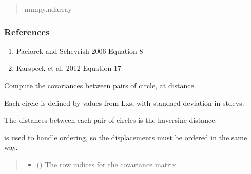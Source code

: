 \documentclass[letterpaper,10pt,english]{sphinxmanual}
\begin{document}
\begin{fulllineitems}
\begin{fulllineitems}
\begin{quote}
\begin{description}
\sphinxAtStartPar
numpy.ndarray

\end{description}\end{quote}
\subsubsection*{References}
\begin{enumerate}
%
\item {}
\sphinxAtStartPar
Paciorek and Schevrish 2006  Equation 8

\item {}
\sphinxAtStartPar
Karspeck et al. 2012  Equation 17

\end{enumerate}

\end{fulllineitems}


\begin{fulllineitems}
\label{\detokenize{ellipse:glomar_gridding.ellipse.EllipseCovarianceBuilder.c_ij_isotropic_array}}
\pysigstartsignatures
\pysiglinewithargsret
{}
{\sphinxparamcomma {}\sphinxparamcomma {}}
{}
\pysigstopsignatures
\sphinxAtStartPar
Compute the covariances between pairs of circle, at distance.

\sphinxAtStartPar
Each circle is defined by values from Lxs, with standard deviation in
stdevs.

\sphinxAtStartPar
The distances between each pair of circles is the haversine distance.

\sphinxAtStartPar
{} is used to handle ordering, so the
displacements must be ordered in the same way.
\begin{quote}\begin{description}
\begin{itemize}
\item {}
\sphinxAtStartPar
{} () \textendash{} The row indices for the covariance matrix.


\end{itemize}
\end{description}
\end{quote}
\end{fulllineitems}
\end{fulllineitems}
\end{document}
